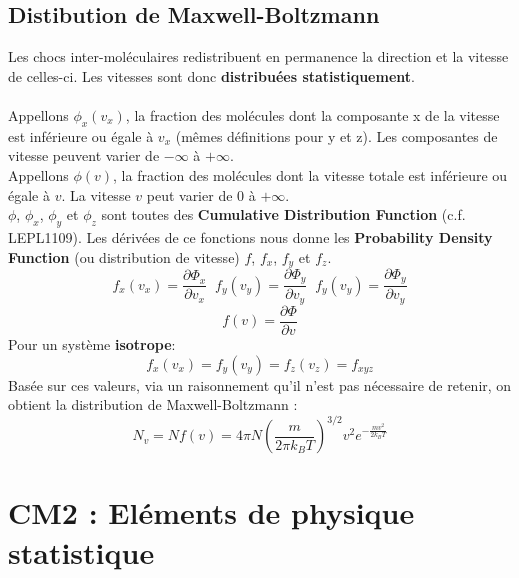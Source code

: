 \documentclass{article}
\begin{document}
    \subsection{Distibution de Maxwell-Boltzmann}
        Les chocs inter-moléculaires redistribuent en permanence la direction et la vitesse de celles-ci. Les vitesses sont donc \textbf{distribuées statistiquement}.\\\\
        Appellons $\phi_x (v_x)$, la fraction des molécules dont la composante x de la vitesse est inférieure ou égale à $v_x$ (mêmes définitions pour y et z).
        Les composantes de vitesse peuvent varier de $-\infty$ à $+\infty$. \\
        Appellons $\phi(v)$, la fraction des molécules dont la vitesse totale est inférieure ou égale à $v$.
        La vitesse $v$ peut varier de 0 à $+\infty$. \\
        $\phi$, $\phi_x$, $\phi_y$ et $\phi_z$ sont toutes des \textbf{Cumulative Distribution Function} (c.f. LEPL1109).
        Les dérivées de ce fonctions nous donne les \textbf{Probability Density Function} (ou distribution de vitesse) $f$, $f_x$, $f_y$ et $f_z$.
        $$
        f_x(v_x) = \frac{\partial \Phi_x}{\partial v_x} \; \; f_y(v_y) = \frac{\partial \Phi_y}{\partial v_y} \; \; f_y(v_y) = \frac{\partial \Phi_y}{\partial v_y}
        $$
        $$
        f(v) = \frac{\partial \Phi}{\partial v}
        $$
        Pour un système \textbf{isotrope}:
        $$
        f_x(v_x) = f_y(v_y) = f_z(v_z) = f_{xyz}
        $$
        Basée sur ces valeurs, via un raisonnement qu'il n'est pas nécessaire de retenir, on obtient la distribution de Maxwell-Boltzmann :
        $$
        N_v = N f(v) = 4 \pi N \left( \frac{m}{2\pi k_B T} \right) ^{3/2} v^2 e^{-\frac{m v^2}{2 k_B T}}
        $$

\section{CM2 : Eléments de physique statistique}
\end{document}
